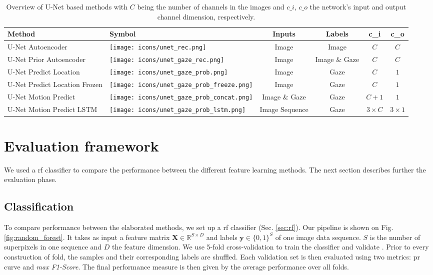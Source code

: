 \begin{table}[!htbp]
   \centering
   \caption[U-Net based method overview]{Overview of U-Net based methods with $C$ being the number of channels in the images and $c\_i$, $c\_o$ the network's input and output channel dimension, respectively.}
   \begin{tabular}{l|m{1.3cm}|c|c|c|c}
      \toprule
      \textbf{Method} & \textbf{Symbol} & \textbf{Inputs} & \textbf{Labels} & \textbf{c\_i} & \textbf{c\_o} \\
      \midrule
      U-Net Autoencoder & \texttt{[image: icons/unet\_rec.png]} & Image & Image & $C$ & $C$ \\
      \midrule
      U-Net Prior Autoencoder & \texttt{[image: icons/unet\_gaze\_rec.png]} & Image & Image \& Gaze & $C$ & $C$ \\
      \midrule
      U-Net Predict Location & \texttt{[image: icons/unet\_gaze\_prob.png]} & Image & Gaze & $C$ & $1$ \\
      \midrule
      U-Net Predict Location Frozen & \texttt{[image: icons/unet\_gaze\_prob\_freeze.png]} & Image & Gaze & $C$ & $1$ \\
      \midrule
      U-Net Motion Predict & \texttt{[image: icons/unet\_gaze\_prob\_concat.png]} & Image \& Gaze & Gaze & $C+1$ & $1$ \\
       \midrule
      U-Net Motion Predict LSTM & \texttt{[image: icons/unet\_gaze\_prob\_lstm.png]} & Image Sequence & Gaze & $3 \times C$ & $3 \times 1$ \\
      \bottomrule
   \end{tabular}
   \label{tab:summary_unet_methods}
\end{table}


\section{Evaluation framework}
We used a \gls{rf} classifier to compare the performance between the different feature learning methods.
The next section describes further the evaluation phase.

\subsection{Classification} \label{random_forest}
To compare performance between the elaborated methods, we set up a \gls{rf} classifier (Sec. \ref{sec:rf}).
Our pipeline is shown on Fig. \ref{fig:random_forest}.
It takes as input a feature matrix $\bm{X} \in \mathbb{R}^{S \times D}$ and labels $\bm{y} \in \{0,1\}^{S}$ of one image data sequence.
$S$ is the number of superpixels in one sequence and $D$ the feature dimension.
We use 5-fold cross-validation to train the classifier and validate \cite[p. 241]{hastie09}.
Prior to every construction of fold, the samples and their corresponding labels are shuffled.
Each validation set is then evaluated using two metrics: \gls{pr} curve and \textit{max F1-Score}.
The final performance measure is then given by the average performance over all folds.

